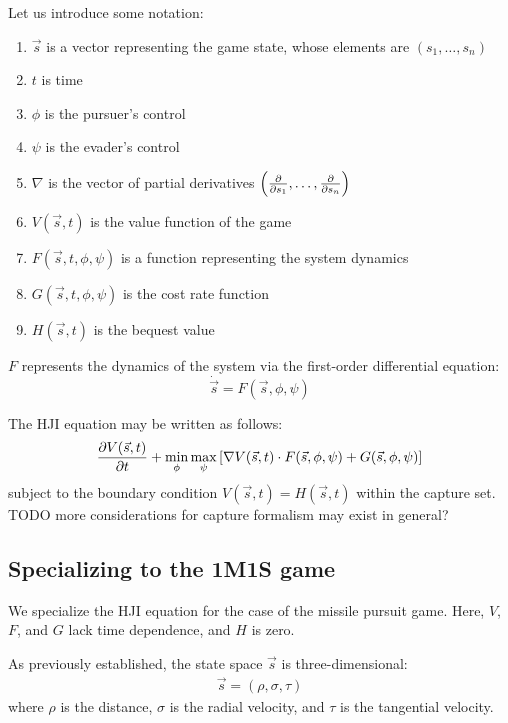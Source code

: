 \documentclass{article}
\begin{document}
Let us introduce some notation:
\begin{enumerate}
\item $\vec{s}$ is a vector representing the game state, whose elements are
$(s_1, \dots, s_n)$
\item $t$ is time
\item $\phi$ is the pursuer's control
\item $\psi$ is the evader's control
\item $\nabla$ is the vector of partial derivatives $\left(\pdv{}{s_1}, \dots,
\pdv{}{s_n}\right)$
\item $V(\vec{s}, t)$ is the value function of the game
\item $F(\vec{s}, t, \phi, \psi)$ is a function representing the system dynamics
\item $G(\vec{s}, t, \phi, \psi)$ is the cost rate function
\item $H(\vec{s}, t)$ is the bequest value
\end{enumerate}

$F$ represents the dynamics of the system via the first-order differential
equation:
\begin{equation}
\dot{\vec{s}} = F(\vec{s}, \phi, \psi)
\end{equation}

The HJI equation may be written as follows:
\begin{align}
\pdv{V(\vec{s}, t)}{t} + \min_{\phi} \max_{\psi} \left[
  \nabla V(\vec{s}, t) \cdot F(\vec{s}, \phi, \psi) + G(\vec{s}, \phi, \psi)
\right]
\end{align}
subject to the boundary condition $V(\vec{s}, t) = H(\vec{s}, t)$ within the
capture set.
TODO more considerations for capture formalism may exist in general?

\subsection{Specializing to the 1M1S game}

We specialize the HJI equation for the case of the missile pursuit game.
Here, $V$, $F$, and $G$ lack time dependence, and $H$ is zero.

As previously established, the state space $\vec{s}$ is three-dimensional:
\begin{align}
\vec{s} = (\rho, \sigma, \tau)
\end{align}
where $\rho$ is the distance, $\sigma$ is the radial velocity, and $\tau$ is the
tangential velocity.
\end{document}
